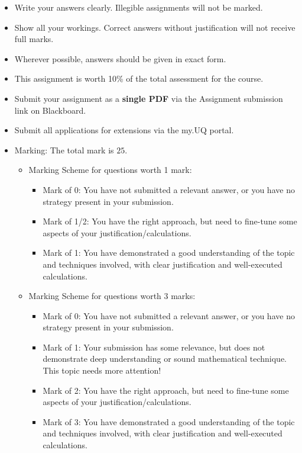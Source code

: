 \documentclass[12pt,english]{article}
\begin{document}
\begin{itemize}
\item Write your answers clearly. Illegible assignments will not be marked. 
\item Show all your workings. Correct answers without justification will
not receive full marks.
\item Wherever possible, answers should be given in exact form.
\item This assignment is worth 10\% of the total assessment for the course.

\item Submit your assignment as a {\bf single PDF} via the Assignment submission
link on Blackboard.
\item Submit all applications for extensions via the my.UQ portal. 
\item Marking: The total mark is $25$.
\begin{itemize}
\item Marking Scheme for questions worth 1 mark:
\begin{itemize}
\item Mark of 0: You have not submitted a relevant answer, or you have no
strategy present in your submission. 
\item Mark of 1/2: You have the right approach, but need to fine-tune some
aspects of your justification/calculations. 
\item Mark of 1: You have demonstrated a good understanding of the topic
and techniques involved, with clear justification and well-executed
calculations. 
\end{itemize}
\item Marking Scheme for questions worth 3 marks:
\begin{itemize}
\item Mark of 0: You have not submitted a relevant answer, or you have no
strategy present in your submission. 
\item Mark of 1: Your submission has some relevance, but does not demonstrate
deep understanding or sound mathematical technique. This topic needs
more attention! 
\item Mark of 2: You have the right approach, but need to fine-tune some
aspects of your justification/calculations. 
\item Mark of 3: You have demonstrated a good understanding of the topic
and techniques involved, with clear justification and well-executed
calculations. 
\end{itemize}
\pagebreak{}
\end{itemize}
\end{itemize}
\end{document}
